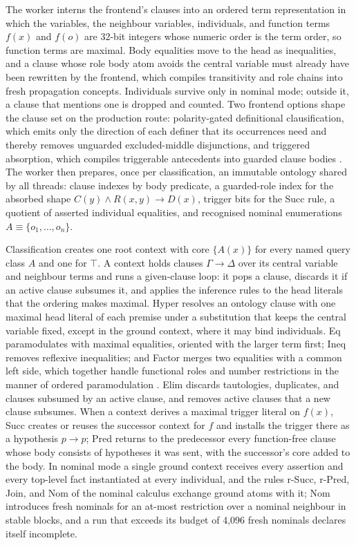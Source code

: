 The worker interns the frontend's clauses into an ordered term representation
in which the variables, the neighbour variables, individuals, and function
terms $f(x)$ and $f(o)$ are 32-bit integers whose numeric order is the term
order, so function terms are maximal.  Body equalities move to the head as
inequalities, and a clause whose role body atom avoids the central variable
must already have been rewritten by the frontend, which compiles transitivity
and role chains into fresh propagation concepts.  Individuals survive only in
nominal mode; outside it, a clause that mentions one is dropped and counted.
Two frontend options shape the clause set on the production route:
polarity-gated definitional clausification, which emits only the direction of
each definer that its occurrences need \cite{plaisted1986structure} and thereby
removes unguarded excluded-middle disjunctions, and triggered absorption, which
compiles triggerable antecedents into guarded clause bodies
\cite{steigmiller2014absorption}.  The worker then prepares, once per
classification, an immutable ontology shared by all threads: clause indexes by
body predicate, a guarded-role index for the absorbed shape
$C(y)\wedge R(x,y)\rightarrow D(x)$, trigger bits for the Succ rule, a quotient of
asserted individual equalities, and recognised nominal enumerations
$A\equiv\{o_1,\ldots,o_n\}$.

Classification creates one root context with core $\{A(x)\}$ for every named
query class $A$ and one for $\top$.  A context holds clauses
$\Gamma\rightarrow\Delta$ over its central variable and neighbour terms and
runs a given-clause loop: it pops a clause, discards it if an active clause
subsumes it, and applies the inference rules to the head literals that the
ordering makes maximal.  Hyper resolves an ontology clause with one maximal
head literal of each premise under a substitution that keeps the central
variable fixed, except in the ground context, where it may bind individuals.
Eq paramodulates with maximal equalities, oriented with the larger term first;
Ineq removes reflexive inequalities; and Factor merges two equalities with a
common left side, which together handle functional roles and number
restrictions in the manner of ordered paramodulation
\cite{bachmair1994rewrite}.  Elim discards tautologies, duplicates, and clauses
subsumed by an active clause, and removes active clauses that a new clause
subsumes.  When a context derives a maximal trigger literal on $f(x)$, Succ
creates or reuses the successor context for $f$ and installs the trigger there
as a hypothesis $p\rightarrow p$; Pred returns to the predecessor every
function-free clause whose body consists of hypotheses it was sent, with the
successor's core added to the body.  In nominal mode a single ground context
receives every assertion and every top-level fact instantiated at every
individual, and the rules r-Succ, r-Pred, Join, and Nom of the nominal calculus
exchange ground atoms with it; Nom introduces fresh nominals for an at-most
restriction over a nominal neighbour in stable blocks, and a run that exceeds
its budget of 4,096 fresh nominals declares itself incomplete.

